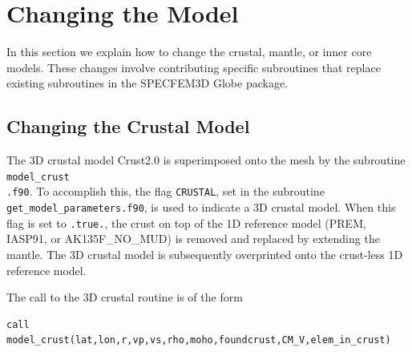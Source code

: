 \chapter{Changing the Model}\label{cha:-Changing-the}

In this section we explain how to change the crustal, mantle, or inner
core models. These changes involve contributing specific subroutines
that replace existing subroutines in the SPECFEM3D Globe package.


\section{Changing the Crustal Model}\label{sec:Changing-the-Crustal}

The 3D crustal model Crust2.0 \citep{BaLaMa00} is superimposed onto
the mesh by the subroutine \texttt{model\_crust}~\\
\texttt{.f90}. To accomplish this, the flag \texttt{CRUSTAL}, set
in the subroutine \texttt{get\_model\_parameters.f90}, is used
to indicate a 3D crustal model. When this flag is set to \texttt{.true.},
the crust on top of the 1D reference model (PREM, IASP91, or AK135F\_NO\_MUD)
is removed and replaced by extending the mantle. The 3D crustal model
is subsequently overprinted onto the crust-less 1D reference model.\newline


The call to the 3D crustal routine is of the form
\begin{verbatim}
call model_crust(lat,lon,r,vp,vs,rho,moho,foundcrust,CM_V,elem_in_crust)
\end{verbatim}

